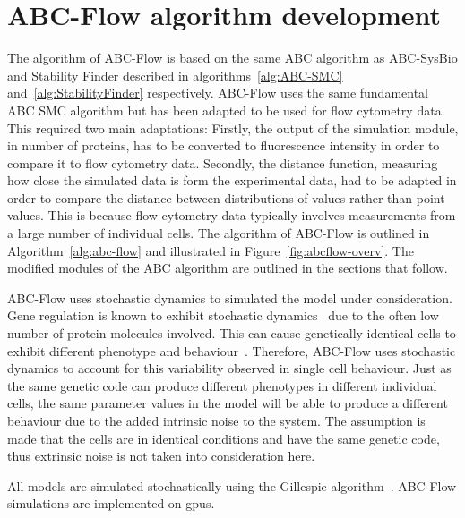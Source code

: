 \section{ABC-Flow algorithm development}
\label{sec:abcflow-meth}

The algorithm of ABC-Flow is based on the same ABC algorithm as ABC-SysBio and Stability Finder described in algorithms~\ref{alg:ABC-SMC} and~\ref{alg:StabilityFinder} respectively. ABC-Flow uses the same fundamental ABC SMC algorithm but has been adapted to be used for flow cytometry data. This required two main adaptations: Firstly, the output of the simulation module, in number of proteins, has to be converted to fluorescence intensity in order to compare it to flow cytometry data. Secondly, the distance function, measuring how close the simulated  data is form the experimental data, had to be adapted in order to compare the distance between distributions of values rather than point values. This is because flow cytometry data typically involves measurements from a large number of individual cells. The algorithm of ABC-Flow is outlined in Algorithm~\ref{alg:abc-flow} and illustrated in Figure~\ref{fig:abcflow-overv}. The modified modules of the ABC algorithm are outlined in the sections that follow.


ABC-Flow uses stochastic dynamics to simulated the model under consideration. Gene regulation is known to exhibit stochastic dynamics~\autocite{Elowitz:2002wq} due to the often low number of protein molecules involved. This can cause genetically identical cells to exhibit different phenotype and behaviour~\autocite{Weinberger:2005uv}. Therefore, ABC-Flow uses stochastic dynamics to account for this variability observed in single cell behaviour. Just as the same genetic code can produce different phenotypes in different individual cells, the same parameter values in the model will be able to produce a different behaviour due to the added intrinsic noise to the system. The assumption is made that the cells are in identical conditions and have the same genetic code, thus extrinsic noise is not taken into consideration here.  


All models are simulated stochastically using the Gillespie algorithm~\autocite{Gillespie:1977ww}. ABC-Flow simulations are implemented on \acrshort{gpu}s. 



